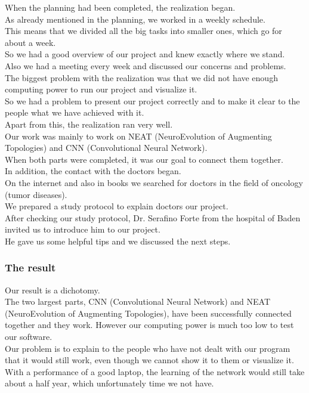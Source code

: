 When the planning had been completed, the realization began. \\
As already mentioned in the planning, we worked in a weekly schedule. \\
This means that we divided all the big tasks into smaller ones, which go for about a week. \\
So we had a good overview of our project and knew exactly where we stand. \\
Also we had a meeting every week and discussed our concerns and problems. \\
The biggest problem with the realization was that we did not have enough computing power to run our project and visualize it. \\
So we had a problem to present our project correctly and to make it clear to the people what we have achieved with it. \\
Apart from this, the realization ran very well.\\
Our work was mainly to work on NEAT (NeuroEvolution of Augmenting Topologies) and CNN (Convolutional Neural Network). \\
When both parts were completed, it was our goal to connect them together. \\
In addition, the contact with the doctors began.  \\
On the internet and also in books we searched for doctors in the field of oncology (tumor diseases). \\
We prepared a study protocol to explain doctors our project. \\
After checking our study protocol, Dr. Serafino Forte from the hospital of Baden invited us to introduce him to our project. \\
He gave us some helpful tips and we discussed the next steps. \\

\subsubsection{The result}

Our result is a dichotomy. \\
The two largest parts, CNN (Convolutional Neural Network) and NEAT (NeuroEvolution of Augmenting Topologies), have been successfully connected together and they work. However our computing power is much too low to test our software. \\
Our problem is to explain to the people who have not dealt with our program that it would still work, even though we cannot show it to them or visualize it. \\
With a performance of a good laptop, the learning of the network would still take about a half year, which unfortunately time we not have.\\

